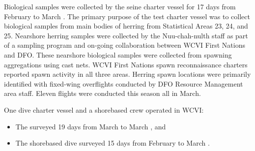 Biological samples were collected by the seine charter vessel
 for 17 days from February  to March .
The primary purpose of the test charter vessel was to
collect biological samples from main bodies of herring
from Statistical Areas 23, 24, and 25.
Nearshore herring samples were collected by the Nuu-chah-nulth staff
as part of a sampling program and on-going collaboration
between WCVI First Nations and DFO.
These nearshore biological samples were collected from
spawning aggregations using cast nets.
WCVI First Nations spawn reconnaissance charters reported
spawn activity in all three areas.
Herring spawn locations were primarily identified with
fixed-wing overflights conducted by DFO Resource Management area staff.
Eleven flights were conducted this season all in March.

One dive charter vessel and a shorebased crew operated in WCVI:

\begin{itemize}

\item The  surveyed 19 days from March  to March , and

\item The shorebased dive surveyed 15 days from February  to March .

\end{itemize}